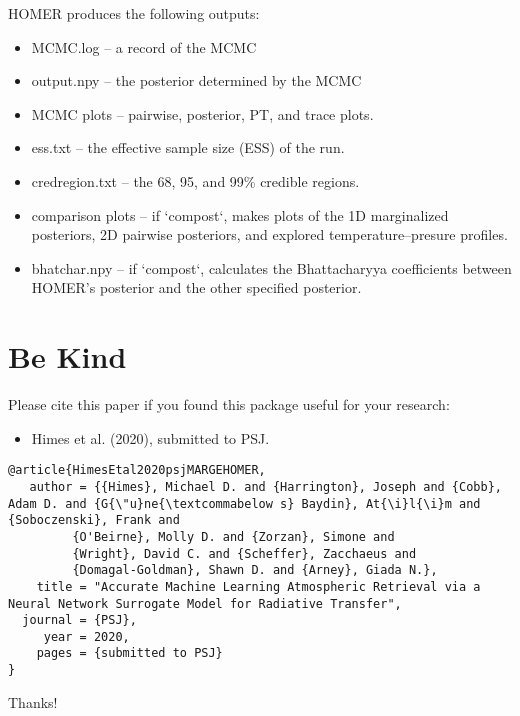 \documentclass[letterpaper, 12pt]{article}
\begin{document}
HOMER produces the following outputs:

\begin{itemize}
\item MCMC.log -- a record of the MCMC
\item output.npy -- the posterior determined by the MCMC
\item MCMC plots -- pairwise, posterior, PT, and trace plots.
\item ess.txt -- the effective sample size (ESS) of the run.
\item credregion.txt -- the 68, 95, and 99\% credible regions.
\item comparison plots -- if `compost`, makes plots of the 1D marginalized 
                          posteriors, 2D pairwise posteriors, and explored 
                          temperature--presure profiles.
\item bhatchar.npy -- if `compost`, calculates the Bhattacharyya coefficients 
                      between HOMER's posterior and the other specified 
                      posterior.
\end{itemize}



\section{Be Kind}
\label{sec:bekind}
Please cite this paper if you found this package useful for your
research:

\begin{itemize}
\item Himes et al. (2020), submitted to PSJ.
\end{itemize}

\begin{verbatim}
@article{HimesEtal2020psjMARGEHOMER,
   author = {{Himes}, Michael D. and {Harrington}, Joseph and {Cobb}, Adam D. and {G{\"u}ne{\textcommabelow s} Baydin}, At{\i}l{\i}m and {Soboczenski}, Frank and
         {O'Beirne}, Molly D. and {Zorzan}, Simone and
         {Wright}, David C. and {Scheffer}, Zacchaeus and
         {Domagal-Goldman}, Shawn D. and {Arney}, Giada N.},
    title = "Accurate Machine Learning Atmospheric Retrieval via a Neural Network Surrogate Model for Radiative Transfer",
  journal = {PSJ},
     year = 2020,
    pages = {submitted to PSJ}
}
\end{verbatim}

\noindent Thanks!


\end{document}
